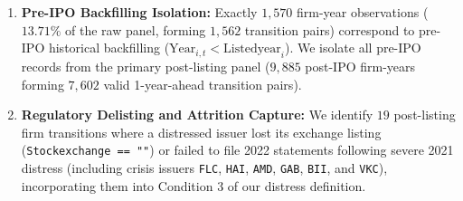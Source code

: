 \documentclass[11pt,a4paper]{article}
\begin{document}
\begin{enumerate}
\begin{equation}
    \end{equation}
    and define clean interest expense as $I_{i,t} = |\text{interestexp}_{i,t}|$ when observed, and $\kappa_{\text{train}} F_{i,t}$ otherwise. Crucially, we prove that defining $\text{EBIT}_{\text{naive}} = \text{NetProfit}_{i,t} + I_{i,t}$ reduces the condition $\text{ICR}_{\text{naive}} = \text{EBIT}_{\text{naive}} / I_{i,t} < 1.0$ to $\text{NetProfit}_{i,t} < 0$, creating a $100\%$ algebraic tautology. We eliminate this tautology by reconstructing true \textbf{Operating EBIT} from top-line accounting identities:
    \begin{equation}
        \text{EBIT}_{\text{op}, i, t} = \text{NetSales}_{i,t} - C_{i,t} - S_{i,t} - A_{i,t}, \qquad \text{ICR}_{\text{op}, i, t} = \frac{\text{EBIT}_{\text{op}, i, t}}{I_{i,t} + \epsilon},
    \end{equation}
    where $\epsilon = 1.0$ VND prevents division by zero for debt-free firms.
    \item \textbf{Pre-IPO Backfilling Isolation:} Exactly $1,570$ firm-year observations ($13.71\%$ of the raw panel, forming $1,562$ transition pairs) correspond to pre-IPO historical backfilling ($\text{Year}_{i,t} < \text{Listedyear}_i$). We isolate all pre-IPO records from the primary post-listing panel ($9,885$ post-IPO firm-years forming $7,602$ valid 1-year-ahead transition pairs).
    \item \textbf{Regulatory Delisting and Attrition Capture:} We identify $19$ post-listing firm transitions where a distressed issuer lost its exchange listing (\texttt{Stockexchange == ""}) or failed to file 2022 statements following severe 2021 distress (including crisis issuers \texttt{FLC}, \texttt{HAI}, \texttt{AMD}, \texttt{GAB}, \texttt{BII}, and \texttt{VKC}), incorporating them into Condition 3 of our distress definition.
\end{enumerate}
\end{document}
